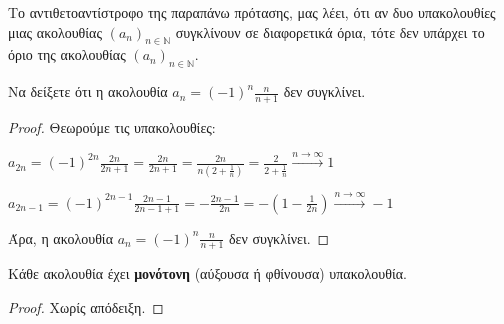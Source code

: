\begin{rem}
  Το αντιθετοαντίστροφο της παραπάνω πρότασης, μας λέει, ότι αν δυο 
  υπακολουθίες μιας ακολουθίας $ (a_{n})_{n \in \mathbb{N}} $ συγκλίνουν σε 
  διαφορετικά όρια, τότε δεν υπάρχει το όριο της ακολουθίας 
  $ (a_{n})_{n \in \mathbb{N}} $.
\end{rem}

\begin{example}
  Να δείξετε ότι η ακολουθία $ a_{n} = (-1)^{n}\frac{n}{n+1} $ δεν συγκλίνει. 
\end{example}

\begin{proof}
\item {}
  Θεωρούμε τις υπακολουθίες:
  \begin{myitemize}[labelindent=1em]
    \item $ a_{2n} = (-1)^{2n} \frac{2n}{2n+1} = \frac{2n}{2n+1} = \frac{2n}{n(2+
      \frac{1}{n})} = \frac{2}{2+ \frac{1}{n}} \xrightarrow{n \to \infty} 1 $
    \item $ a_{2n-1} = (-1)^{2n-1} \frac{2n-1}{2n-1+1} = -\frac{2n-1}{2n} = 
      -\left(1 - \frac{1}{2n}\right) \xrightarrow{n \to \infty} -1  $
  \end{myitemize}
  Άρα, η ακολουθία $ a_{n}= (-1)^{n} \frac{n}{n+1} $ δεν συγκλίνει.
\end{proof}


\begin{mybox3}
  \begin{prop}
    \label{prop:monoton}
    Κάθε ακολουθία έχει \textbf{μονότονη} (αύξουσα ή φθίνουσα) υπακολουθία.
  \end{prop}
\end{mybox3}
\begin{proof}
  Χωρίς απόδειξη.
\end{proof}

